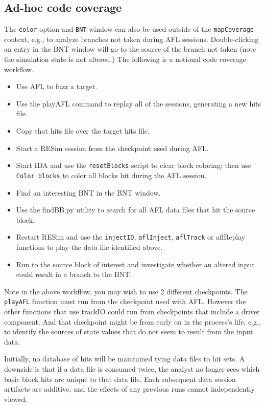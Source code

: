 \documentclass[titlepage]{article}
\begin{document}
\begin{appendices}
\subsection{Ad-hoc code coverage}
The {\tt color} option and {\tt BNT} window can also be used outside of the {\tt mapCoverage} context, e.g., to analyze branches not 
taken during AFL sessions.  Double-clicking an entry in the BNT window will go to the source of the branch not taken (note the simulation state
is not altered.)  The following is a notional code coverage workflow.
\begin{itemize}
\item Use AFL to fuzz a target.
\item Use the playAFL command to replay all of the sessions, generating a new hits file.
\item Copy that hits file over the target hits file.
\item Start a RESim session from the checkpoint used during AFL.
\item Start IDA and use the {\tt resetBlocks} script to clear block coloring; then use {\tt Color blocks} to color all blocks hit
during the AFL session.
\item Find an interesting BNT in the BNT window.
\item Use the findBB.py utility to search for all AFL data files that hit the source block.
\item Restart RESim and use the {\tt injectIO}, {\tt aflInject}, {\tt aflTrack} or {aflReplay} functions to play the data file identified above.
\item Run to the source block of interest and investigate whether an altered input could result in a branch to the BNT.
\end{itemize}
Note in the above workflow, you may wish to use 2 different checkpoints.  The {\tt playAFL} function must run from the
checkpoint used with AFL.  However the other functions that use trackIO could run from checkpoints that include a driver component.  And 
that checkpoint might be from early on in the process's life, e.g., to identify the sources of state values that do not seem to result from
the input data.

Initially, no database of hits will be maintained tying data files to hit sets.  A downside is that if a data file is consumed twice, the analyst no longer sees
which basic block hits are unique to that data file. Each subsequent data session artifacts are additive, and the effects of any previous runs cannot independently viewed.


\end{appendices}
\end{document}
